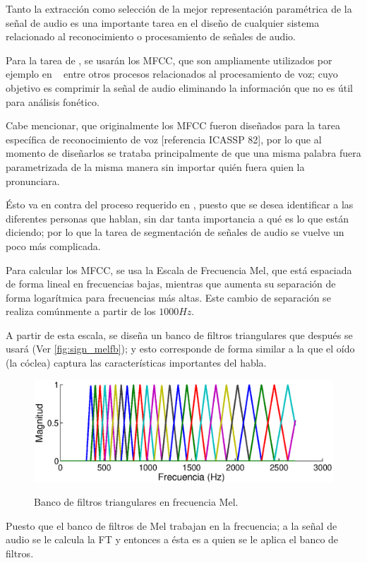 Tanto la extracción como selección de la mejor representación paramétrica de la señal de audio es una importante tarea en el diseño de cualquier sistema relacionado al reconocimiento o procesamiento de señales de audio. 

Para la tarea de \sd, se usarán los \ac{MFCC}, que son ampliamente utilizados por ejemplo en \sd~ entre otros procesos relacionados al procesamiento de voz; cuyo objetivo es comprimir la señal de audio eliminando la información que no es útil para análisis fonético.

Cabe mencionar, que originalmente los \ac{MFCC} fueron diseñados para la tarea específica de reconocimiento de voz [referencia ICASSP 82], por lo que al momento de diseñarlos se trataba principalmente de que una misma palabra fuera parametrizada de la misma manera sin importar quién fuera quien la pronunciara. 

Ésto va en contra del proceso requerido en \sd, puesto que se desea identificar a las diferentes personas que hablan, sin dar tanta importancia a qué es lo que están diciendo; por lo que la tarea de segmentación de señales de audio se vuelve un poco más complicada.

Para calcular los \ac{MFCC}, se usa la Escala de Frecuencia Mel, que está espaciada de forma lineal en frecuencias bajas, mientras que aumenta su separación de forma logarítmica para frecuencias más altas. Este cambio de separación se realiza comúnmente a partir de los $1000Hz$. 

A partir de esta escala, se diseña un banco de filtros triangulares que después se usará (Ver \autoref{fig:sign_melfb}); y esto corresponde de forma similar a la que el oído (la cóclea) captura las características importantes del habla. 

\begin{figure}[t]
  \myfloatalign
  {\includegraphics[width=0.9\linewidth]{gfx/chap2/mfcc_filterbank}} \quad
  \caption{Banco de filtros triangulares en frecuencia Mel.}
  \label{fig:sign_melfb}
\end{figure}  

Puesto que el banco de filtros de Mel trabajan en la frecuencia; a la señal de audio se le calcula la \ac{FT} y entonces a ésta es a quien se le aplica el banco de filtros.

